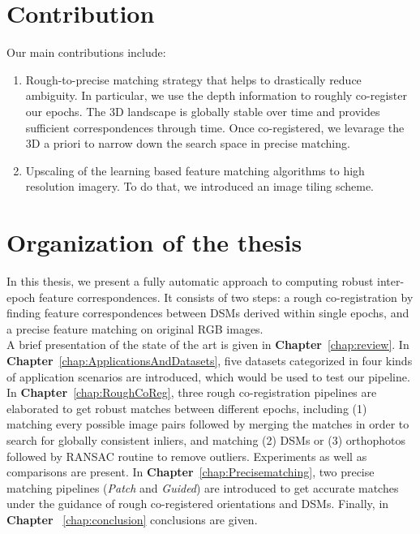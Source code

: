 
\section{Contribution}
Our main contributions include:\\
\begin{enumerate}
	\item Rough-to-precise matching strategy that helps to drastically reduce ambiguity. In particular, we use the depth information to roughly co-register our epochs. The 3D landscape is globally stable over time and provides sufficient correspondences through time. Once co-registered, we levarage the 3D a priori to narrow down the search space in precise matching.
	\item Upscaling of the learning based feature matching algorithms to high resolution imagery. To do that, we introduced an image tiling scheme.
\end{enumerate}

\section{Organization of the thesis}
In this thesis, we present a fully automatic approach to computing robust inter-epoch feature correspondences. It consists of two steps: a rough co-registration by finding feature correspondences between \ac{DSM}s derived within single epochs, and a precise feature matching on original RGB images. \\
A brief presentation of the state of the art is given in \textbf{Chapter}~\ref{chap:review}. 
In \textbf{Chapter}~\ref{chap:ApplicationsAndDatasets}, five datasets categorized in four kinds of application scenarios are introduced, which would be used to test our pipeline.
In \textbf{Chapter}~\ref{chap:RoughCoReg}, three rough co-registration pipelines are elaborated to get robust matches between different epochs, including (1) matching every possible image pairs followed by merging the matches in order to search for globally consistent inliers, and matching (2) \ac{DSM}s or (3) orthophotos followed by RANSAC routine to remove outliers.
Experiments as well as comparisons are present.
In \textbf{Chapter}~\ref{chap:Precisematching}, two precise matching pipelines (\textit{Patch} and \textit{Guided}) are introduced to get accurate matches under the guidance of rough co-registered orientations and \ac{DSM}s.
Finally, in \textbf{Chapter} ~\ref{chap:conclusion} conclusions are given.
